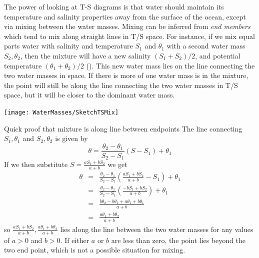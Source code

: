 The power of looking at T-S diagrams is that water should maintain its temperature and salinity properties away from the surface of the ocean, except via mixing between the water masses.  Mixing can be inferred from \emph{end members} which tend to mix along straight lines in T/S space.  For instance, if we mix equal parts water with salinity and temperature $S_1$ and $\theta_1$ with a second water mass $S_2, \theta_2$, then the mixture will have a new salinity $(S_1 + S_2) / 2$, and potential temperature $(\theta_1 + \theta_2)/2$ ().  This new water mass lies on the line connecting the two water masses in space.  If there is more of one water mass is in the mixture, the point will still be along the line connecting the two water masses in T/S space, but it will be closer to the dominant water mass.

\begin{marginfigure}
  \centering
  \texttt{[image: WaterMasses/SketchTSMix]}
      \caption{Result of mixing two water masses in T/S space.  An equal mixture will lie midway on the line between the two water masses.  An unequal mixture will also be along the line.  }
    \label{fig:SketchTSMix}  
\end{marginfigure}


\begin{derivbox}[label={box:TSalongLine}]{Quick proof that mixture is along line between endpoints}
The line connecting $S_1,\theta_1$ and $S_2,\theta_2$ is given by 
\begin{equation}
    \theta = \frac{\theta_2 - \theta_1}{S_2 - S_1} \left(S-S_1 \right) + \theta_1
\end{equation}
If we then substitute $S=\frac{aS_1 + bS_2}{a+b}$ we get
\begin{eqnarray*}
    \theta & = & \frac{\theta_2 - \theta_1}{S_2 - S_1} \left( \frac{aS_1 + bS_2}{a+b}-S_1 \right) + \theta_1\\
    & = & \frac{\theta_2 - \theta_1}{S_2 - S_1} \left( \frac{-bS_1 + bS_2}{a+b}\right) + \theta_1\\
    & = & \frac{b\theta_2 - b \theta_1+ a\theta_1 + b\theta_1}{a+b}\\
    & = & \frac{a\theta_1 + b\theta_2}{a+b}     
\end{eqnarray*}
so $\frac{aS_1 + bS_2}{a+b}, \frac{a\theta_1 + b\theta_2}{a+b}$ lies along the line between the two water masses for any values of $a>0$ and $b>0$.  If either $a$ or $b$ are less than zero, the point lies beyond the two end point, which is not a possible situation for mixing.  
\end{derivbox}

